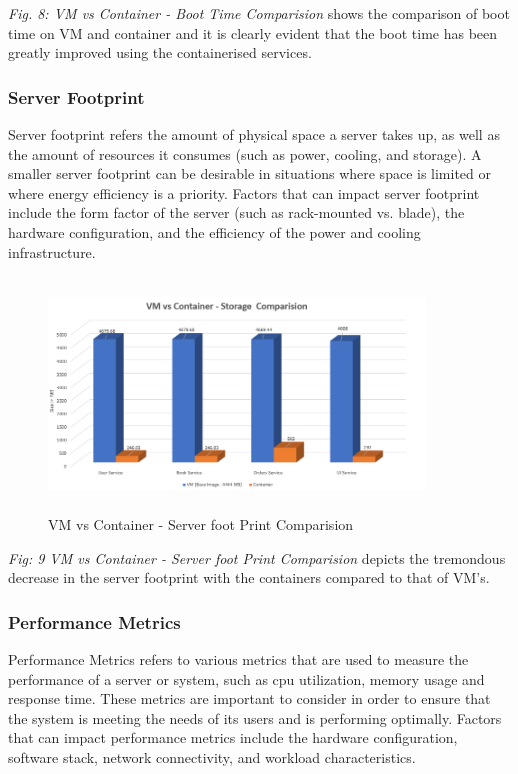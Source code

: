  \emph{Fig. 8: VM vs Container - Boot Time Comparision} shows the comparison of boot time on VM and container and it is clearly evident that the boot time has been greatly improved using the containerised services.

\subsubsection{Server Footprint }
Server footprint refers the amount of physical space a server takes up, as well as the amount of resources it consumes (such as power, cooling, and storage). A smaller server footprint can be desirable in situations where space is limited or where energy efficiency is a priority. Factors that can impact server footprint include the form factor of the server (such as rack-mounted vs. blade), the hardware configuration, and the efficiency of the power and cooling infrastructure.

\begin{figure}[!h]
    \centering
    \includegraphics[width=10cm, height=6.2cm]{images/footcomp.png}
    \caption{VM vs Container - Server foot Print Comparision}
\end{figure}

\emph{Fig: 9 VM vs Container - Server foot Print Comparision} depicts the tremondous decrease in the server footprint with the containers compared to that of VM's.


\subsubsection{Performance Metrics}
Performance Metrics refers to various metrics that are used to measure the performance of a server or system, such as cpu utilization, memory usage  and response time. These metrics are important to consider in order to ensure that the system is meeting the needs of its users and is performing optimally. Factors that can impact performance metrics include the hardware configuration, software stack, network connectivity, and workload characteristics.

